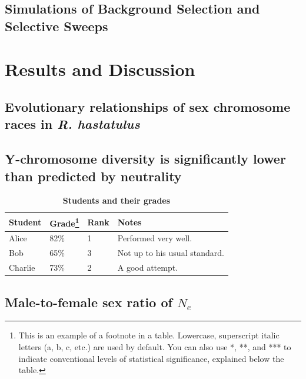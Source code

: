 \documentclass[9pt,twocolumn,twoside]{gsajnl}
\begin{document}
\subsection*{Simulations of Background Selection and Selective Sweeps} 

\section*{Results and Discussion}

\subsection*{Evolutionary relationships of sex chromosome races in \textit{R. hastatulus}} 
\subsection*{Y-chromosome diversity is significantly lower than predicted by neutrality} 

\begin{table}[htbp]
\centering
\caption{\bf Students and their grades}
\begin{tableminipage}{\textwidth}
\begin{tabularx}{\textwidth}{XXXX}
\hline
Student & Grade\footnote{This is an example of a footnote in a table. Lowercase, superscript italic letters (a, b, c, etc.) are used by default. You can also use *, **, and *** to indicate conventional levels of statistical significance, explained below the table.} & Rank & Notes \\
\hline
Alice & 82\% & 1 & Performed very well.\\
Bob & 65\% & 3 & Not up to his usual standard.\\
Charlie & 73\% & 2 & A good attempt.\\
\hline
\end{tabularx}
  \label{tab:shape-functions}
\end{tableminipage}
\end{table}

\subsection*{Male-to-female sex ratio of $N_{e}$} 
\end{document}
